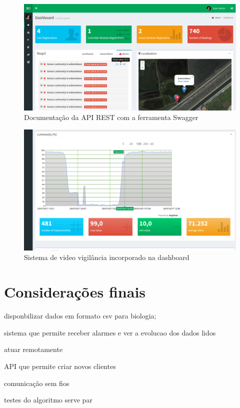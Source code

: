\begin{figure}[h]
	\centering
	\includegraphics[width=0.8\linewidth]{prints-web/dashboard1.png}
	\caption{Documentação da API REST com a ferramenta Swagger}
	\label{testgra2p}
\end{figure}






















\newpage



\begin{figure}[h]
	\centering
	\includegraphics[width=0.7\linewidth]{prints-web/humidity.png}
	\caption{Sistema de video vigilância incorporado na dashboard}
	\label{testgrap}
\end{figure}



\section{Considerações finais}



disponbilizar dados em formato csv para biologia; 

sistema que permite receber alarmes e ver a evolucao dos dados lidos 

atuar remotamente 

API que permite criar novos clientes 

comunicação sem fios 


testes do algoritmo serve par
